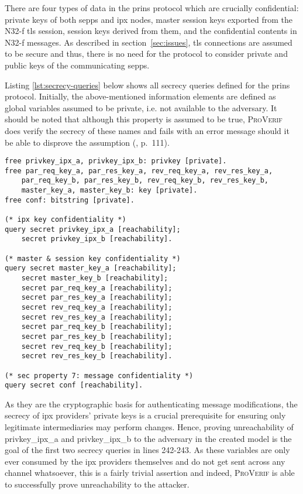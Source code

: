There are four types of data in the \gls{prins} protocol which are crucially confidential: private keys of both \glspl{sepp} and \gls{ipx} nodes, master session keys exported from the N32-f \gls{tls} session, session keys derived from them, and the confidential contents in N32-f messages.
As described in section~\ref{sec:issues}, \gls{tls} connections are assumed to be secure and thus, there is no need for the protocol to consider private and public keys of the communicating \glspl{sepp}.

Listing \ref{lst:secrecy-queries} below shows all secrecy queries defined for the \gls{prins} protocol.
Initially, the above-mentioned information elements are defined as global variables assumed to be private, i.e. not available to the adversary.
It should be noted that although this property is assumed to be true, \textsc{ProVerif} does verify the secrecy of these names and fails with an error message should it be able to disprove the assumption (\cite{blanchet2020proverif}, p.~111).

\begin{lstlisting}[caption={Secrecy Queries},label={lst:secrecy-queries},firstnumber=235]
free privkey_ipx_a, privkey_ipx_b: privkey [private].
free par_req_key_a, par_res_key_a, rev_req_key_a, rev_res_key_a,
    par_req_key_b, par_res_key_b, rev_req_key_b, rev_res_key_b,
    master_key_a, master_key_b: key [private].
free conf: bitstring [private].

(* ipx key confidentiality *)
query secret privkey_ipx_a [reachability];
    secret privkey_ipx_b [reachability].

(* master & session key confidentiality *)
query secret master_key_a [reachability];
    secret master_key_b [reachability];
    secret par_req_key_a [reachability];
    secret par_res_key_a [reachability];
    secret rev_req_key_a [reachability];
    secret rev_res_key_a [reachability];
    secret par_req_key_b [reachability];
    secret par_res_key_b [reachability];
    secret rev_req_key_b [reachability];
    secret rev_res_key_b [reachability].

(* sec property 7: message confidentiality *)
query secret conf [reachability].
\end{lstlisting}

As they are the cryptographic basis for authenticating message modifications, the secrecy of \gls{ipx} providers' private keys is a crucial prerequisite for ensuring only legitimate intermediaries may perform changes.
Hence, proving unreachability of {\sffamily privkey\_ipx\_a} and {\sffamily privkey\_ipx\_b} to the adversary in the created model is the goal of the first two secrecy queries in lines 242-243.
As these variables are only ever consumed by the \gls{ipx} providers themselves and do not get sent across any channel whatsoever, this is a fairly trivial assertion and indeed, \textsc{ProVerif} is able to successfully prove unreachability to the attacker.

